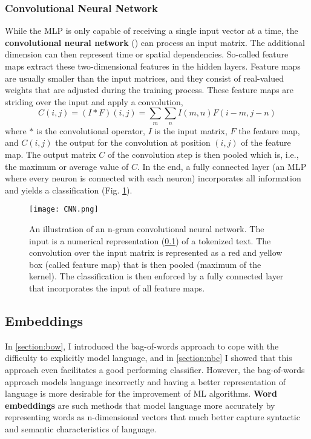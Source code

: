 \subsubsection{Convolutional Neural Network}
  While the MLP is only capable of receiving a single input vector at a time, the \textbf{convolutional neural network} () can process an input matrix.
  The additional dimension can then represent time or spatial dependencies.
  So-called feature maps extract these two-dimensional features in the hidden layers.
  Feature maps are usually smaller than the input matrices, and they consist of real-valued weights that are adjusted during the training process.
  These feature maps are striding over the input and apply a convolution,
  \[C(i,j) = (I \ast F)(i,j) = \sum_m \sum_n I(m, n) F(i-m, j-n)\] where $\ast$ is the convolutional operator, $I$ is the input matrix, $F$ the feature map, and $C(i,j)$ the output for the convolution at position $(i,j)$ of the feature map.
  The output matrix $C$ of the convolution step is then pooled which is, i.e., the maximum or average value of $C$.
  In the end, a fully connected layer (an MLP where every neuron is connected with each neuron) incorporates all information and yields a classification (Fig. \ref{fig:cnn}).
  \begin{figure}[h!]
      \centering
      \texttt{[image: CNN.png]}
      \caption{An illustration of an n-gram convolutional neural network. The input is a numerical representation (\ref{section:embeddings}) of a tokenized text. The convolution over the input matrix is represented as a red and yellow box (called feature map) that is then pooled (maximum of the kernel). The classification is then enforced by a fully connected layer that incorporates the input of all feature maps.}
      \label{fig:cnn}
  \end{figure}

\subsection{Embeddings}\label{section:embeddings}
  In \ref{section:bow}, I introduced the bag-of-words approach to cope with the difficulty to explicitly model language, and in \ref{section:nbc} I showed that this approach even facilitates a good performing classifier.
  However, the bag-of-words approach models language incorrectly and having a better representation of language is more desirable for the improvement of ML algorithms.
  \textbf{Word embeddings} are such methods that model language more accurately by representing words as n-dimensional vectors that much better capture syntactic and semantic characteristics of language.

